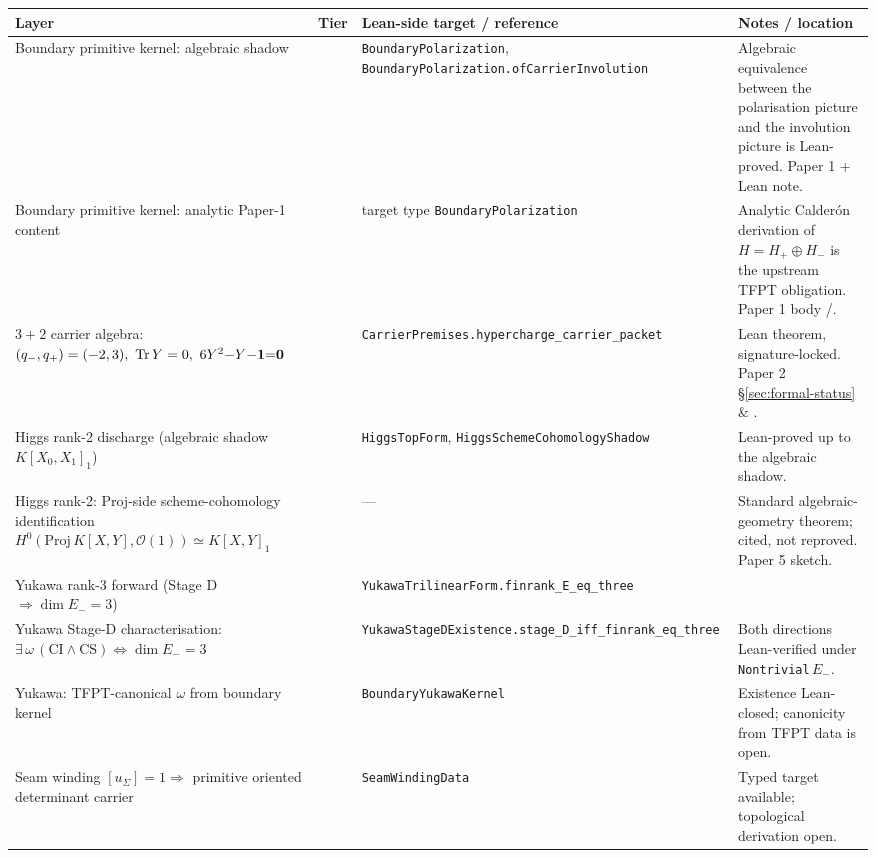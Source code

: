 \documentclass[11pt,a4paper]{article}
\begin{document}
\begin{center}
\footnotesize
\begin{tabularx}{\textwidth}{@{}p{}p{}p{}Y@{}}
\toprule
\textbf{Layer} & \textbf{Tier} & \textbf{Lean-side target / reference} & \textbf{Notes / location} \\
\midrule
Boundary primitive kernel: algebraic shadow
  & 
  & \texttt{BoundaryPolarization}, \texttt{BoundaryPolarization.ofCarrierInvolution}
  & Algebraic equivalence between the polarisation picture and the involution picture is Lean-proved. Paper 1 + Lean note. \\
Boundary primitive kernel: analytic Paper-1 content
  & 
  & target type \texttt{BoundaryPolarization}
  & Analytic Calder\'on derivation of $H = H_+ \oplus H_-$ is the upstream TFPT obligation. Paper 1 body /. \\
$3+2$ carrier algebra:
  $(q_-,q_+)=(-2,3),\ \tr Y=0,\ 6Y^2{-}Y{-}\mathbf 1{=}\mathbf 0$
  & 
  & \texttt{CarrierPremises.hypercharge\_carrier\_packet}
  & Lean theorem, signature-locked. Paper 2 \S\ref{sec:formal-status} \& . \\
Higgs rank-2 discharge (algebraic shadow $K[X_0,X_1]_1$)
  & 
  & \texttt{HiggsTopForm}, \texttt{HiggsSchemeCohomologyShadow}
  & Lean-proved up to the algebraic shadow. \\
Higgs rank-2: Proj-side scheme-cohomology identification
  $H^0(\mathrm{Proj}\,K[X,Y], \mathcal O(1)) \simeq K[X,Y]_1$
  & 
  & ---
  & Standard algebraic-geometry theorem; cited, not reproved. Paper 5  sketch. \\
Yukawa rank-3 forward (Stage D $\Rightarrow \dim E_-=3$)
  & 
  & \texttt{YukawaTrilinearForm.finrank\_E\_eq\_three}
  & \\
Yukawa Stage-D characterisation:
  $\exists\,\omega\,(\textrm{CI}{\wedge}\textrm{CS}) \iff \dim E_-=3$
  & 
  & \texttt{YukawaStageDExistence.stage\_D\_iff\_finrank\_eq\_three}
  & Both directions Lean-verified under \texttt{Nontrivial}\,$E_-$. \\
Yukawa: TFPT-canonical $\omega$ from boundary kernel
  & 
  & \texttt{BoundaryYukawaKernel}
  & Existence Lean-closed; canonicity from TFPT data is open. \\
Seam winding
  $[u_\Sigma]=1 \Rightarrow$ primitive oriented determinant carrier
  & 
  & \texttt{SeamWindingData}
  & Typed target available; topological derivation open. \\

\end{tabularx}
\end{center}
\end{document}
